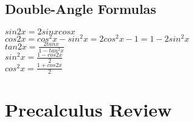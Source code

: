 \documentclass{article}
\begin{document}
	\subsection*{Double-Angle Formulas}
		\begin{center}
		$sin2x = 2sinxcosx$\\
		
		$cos2x = cos^2x - sin^2x = 2cos^2x-1 = 1-2sin^2x$\\
		
		$tan2x = \frac{2tanx}{1 - tan^2x}$\\
		
		$sin^2x = \frac{1 - cos2x}{2}$\\
		
		$cos^2x = \frac{1+cos2x}{2}$
		\end{center}
\section* {Precalculus Review}
\end{document}
